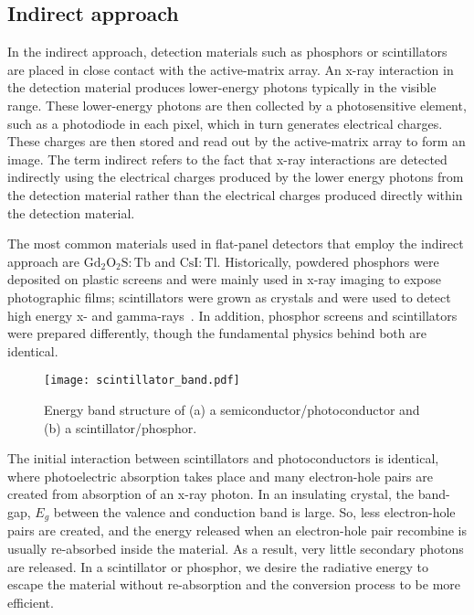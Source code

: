 \subsection{Indirect approach}
In the indirect approach, detection materials such as phosphors or scintillators are placed in close contact with the active-matrix array.  An x-ray interaction in the detection material produces lower-energy photons typically in the visible range.  These lower-energy photons are then collected by a photosensitive element, such as a photodiode in each pixel, which in turn generates electrical charges.  These charges are then stored and read out by the active-matrix array to form an image.  The term indirect refers to the fact that x-ray interactions are detected indirectly using the electrical charges produced by the lower energy photons from the detection material rather than the electrical charges produced directly within the detection material.  

The most common materials used in flat-panel detectors that employ the indirect approach are $\mathrm{Gd_2O_2S:Tb}$ and $\mathrm{CsI:Tl}$.  Historically, powdered phosphors were deposited on plastic screens and were mainly used in x-ray imaging to expose photographic films; scintillators were grown as crystals and were used to detect high energy x- and gamma-rays~\citep{Nikl2006}.  In addition, phosphor screens and scintillators were prepared differently, though the fundamental physics behind both are identical.  

\begin{figure}[h]
\centering
\texttt{[image: scintillator\_band.pdf]}
\caption{Energy band structure of (a) a semiconductor/photoconductor and (b) a scintillator/phosphor.}
\label{fig:scintillator_band}
\end{figure}


The initial interaction between scintillators and photoconductors is identical, where photoelectric absorption takes place and many electron-hole pairs are created from absorption of an x-ray photon.  In an insulating crystal, the band-gap, $E_g$ between the valence and conduction band is large.  So, less electron-hole pairs are created, and the energy released when an electron-hole pair recombine is usually re-absorbed inside the material.  As a result, very little secondary photons are released.  In a scintillator or phosphor, we desire the radiative energy to escape the material without re-absorption and the conversion process to be more efficient.

